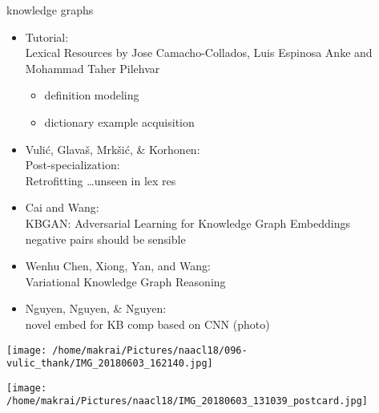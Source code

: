 \documentclass{beamer}
\begin{document}
\begin{frame}[allowframebreaks]{knowledge graphs}
  \begin{itemize}
    \item Tutorial: \\  Lexical Resources 
      by Jose Camacho-Collados, Luis Espinosa Anke and Mohammad Taher Pilehvar 
      \begin{itemize}
        \item definition modeling
        \item dictionary example acquisition
      \end{itemize}
    \item Vulić, Glavaš, Mrkšić, \& Korhonen: \\  
      Post-specialization: \\  Retrofitting \dots  unseen in lex res
    \item Cai and Wang: \\  KBGAN: Adversarial Learning for Knowledge Graph Embeddings
      \\ negative pairs should be sensible
    \item Wenhu Chen, Xiong, Yan, and Wang: \\  Variational Knowledge Graph Reasoning
    \item Nguyen, Nguyen, \& Nguyen: \\  novel embed for KB comp based on CNN (photo)
  \end{itemize}
  \texttt{[image: /home/makrai/Pictures/naacl18/096-vulic\_thank/IMG\_20180603\_162140.jpg]}

\end{frame}

\begin{frame}
  \texttt{[image: /home/makrai/Pictures/naacl18/IMG\_20180603\_131039\_postcard.jpg]}
\end{frame}
\end{document}
